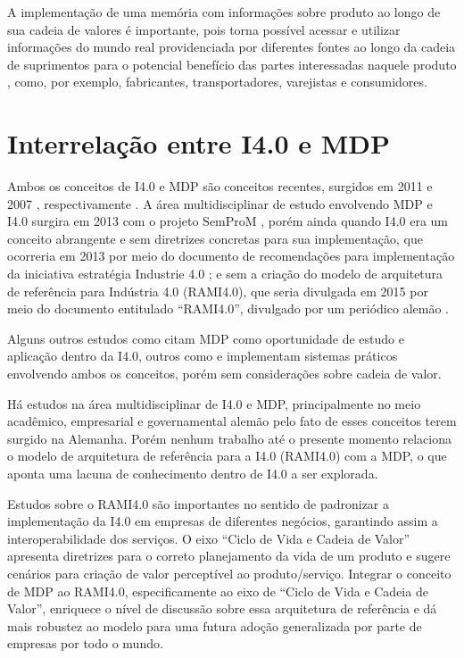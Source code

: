 	A implementação de uma memória com informações sobre produto ao longo de sua cadeia de valores é importante, pois torna possível acessar e utilizar informações do mundo real providenciada por diferentes fontes ao longo da cadeia de suprimentos para o potencial benefício das partes interessadas naquele produto \cite{brandherm2011productmemory}, como, por exemplo, fabricantes, transportadores, varejistas e consumidores. 
	
\section{Interrelação entre I4.0 e MDP}

 	Ambos os conceitos de I4.0 e MDP são conceitos recentes, surgidos em 2011 \cite{kagermann2011industrie} e 2007 \cite{wahlster2007digitalmemory}, respectivamente . A área multidisciplinar de estudo envolvendo MDP e I4.0 surgira em 2013 com o projeto SemProM \cite{wahlster2013semprom}, porém ainda quando I4.0 era um conceito abrangente e sem diretrizes concretas para sua implementação, que ocorreria em 2013 por meio do documento de recomendações para implementação da iniciativa estratégia Industrie 4.0 \cite{kagermann2013recommendations}; e sem a criação do modelo de arquitetura de referência para Indústria 4.0 (RAMI4.0), que seria divulgada em 2015 por meio do documento entitulado ``RAMI4.0'', divulgado por um periódico alemão \cite{hankel2015rami}.
 	
 	 Alguns outros estudos como  citam MDP como oportunidade de estudo e aplicação dentro da I4.0, outros como  e  implementam sistemas práticos envolvendo ambos os conceitos, porém sem considerações sobre cadeia de valor.
 	
	Há estudos na área multidisciplinar de I4.0 e MDP, principalmente no meio acadêmico, empresarial e governamental alemão pelo fato de esses conceitos terem surgido na Alemanha. Porém nenhum trabalho até o presente momento relaciona o modelo de arquitetura de referência para a I4.0 (RAMI4.0) com a MDP, o que aponta uma lacuna de conhecimento dentro de I4.0 a ser explorada.
	
	Estudos sobre o RAMI4.0 são importantes no sentido de padronizar a implementação da I4.0 em empresas de diferentes negócios, garantindo assim a interoperabilidade dos serviços. O eixo ``Ciclo de Vida e Cadeia de Valor'' apresenta diretrizes para o correto planejamento da vida de um produto e sugere cenários para criação de valor perceptível ao produto/serviço. Integrar o conceito de MDP ao RAMI4.0, especificamente ao eixo de ``Ciclo de Vida e Cadeia de Valor'', enriquece o nível de discussão sobre essa arquitetura de referência e dá mais robustez ao modelo para uma futura adoção generalizada por parte de empresas por todo o mundo.
	
